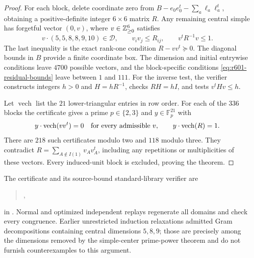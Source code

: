 \begin{proof}
For each block, delete coordinate zero from
$B-e_0e_0^t-\sum_a\ell_a\ell_a^t$, obtaining a positive-definite
integer $6\times6$ matrix $R$. Any remaining central simple has
forgetful vector $(0,v)$, where $v\in\mathbb Z_{\ge0}^6$ satisfies
\begin{equation}\label{eq:r601-residual-bounds}
v\cdot(5,5,8,8,9,10)\in\mathcal D,\qquad
v_iv_j\le R_{ij},\qquad v^tR^{-1}v\le1.
\end{equation}
The last inequality is the exact rank-one condition
$R-vv^t\succeq0$. The diagonal bounds in $B$ provide a finite
coordinate box. The dimension and initial entrywise conditions leave
$4700$ possible vectors, and the block-specific conditions
\eqref{eq:r601-residual-bounds} leave between $1$ and $111$.
For the inverse test, the verifier constructs integers $h>0$ and
$H=hR^{-1}$, checks $RH=hI$, and tests $v^tHv\le h$.

Let $\operatorname{vech}$ list the $21$ lower-triangular entries
in row order. For each of the $336$ blocks the certificate gives a
prime $p\in\{2,3\}$ and $y\in\mathbb F_p^{21}$ with
\[
y\cdot\operatorname{vech}(vv^t)=0
\quad\hbox{for every admissible }v,
\qquad y\cdot\operatorname{vech}(R)=1.
\]
There are $218$ such certificates modulo two and $118$ modulo three.
They contradict $R=\sum_{A\notin I(1)}v_Av_A^t$, including any
repetitions or multiplicities of these vectors. Every induced-unit
block is excluded, proving the theorem.
\end{proof}

The certificate and its source-bound standard-library verifier are
\begin{quote}\small
{},\\
\end{quote}
in .
Normal and optimized independent replays regenerate all domains and
check every congruence. Earlier unrestricted induction relaxations
admitted Gram decompositions containing central dimensions $5,8,9$;
those are precisely among the dimensions removed by the simple-center
prime-power theorem and do not furnish counterexamples to this argument.
